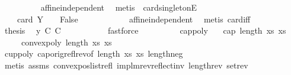 \begin{isabellebody}
\ \ \ \ \ \ \ \ \isamarkupfalse%
\ affine{\isacharunderscore}{\kern0pt}independent{\isacharunderscore}{\kern0pt}{}\ \isamarkupfalse%
\ {\isacharparenleft}{\kern0pt}metis\ {\isachardoublequoteopen}{}{\isachardoublequoteclose}\ card{\isacharunderscore}{\kern0pt}{}{\isacharunderscore}{\kern0pt}singletonE{\isacharparenright}{\kern0pt}\isanewline
\ \ \ \ \ \ \isamarkupfalse%
\ \ \ \ {\isachardoublequoteopen}card\ Y\ {\isacharequal}{\kern0pt}\ {}\ {\isasymLongrightarrow}\ False{\isachardoublequoteclose}\ \isanewline
\ \ \ \ \ \ \ \ \isamarkupfalse%
\ {\isachardoublequoteopen}{}{\isachardoublequoteclose}\ affine{\isacharunderscore}{\kern0pt}independent{\isacharunderscore}{\kern0pt}{}\ \isamarkupfalse%
\ {\isacharparenleft}{\kern0pt}metis\ card{\isacharunderscore}{\kern0pt}{}{\isacharunderscore}{\kern0pt}iff{\isacharparenright}{\kern0pt}\isanewline
\ \ \ \ \ \ \isamarkupfalse%
\ {\isacharquery}{\kern0pt}thesis\ \isamarkupfalse%
\ y{\isacharunderscore}{\kern0pt}{}\ C{}\ C{}\ \isanewline
\ \ \ \ \ \ \ \ \isamarkupfalse%
\ fastforce\ \isanewline
\ \ \ \ \isamarkupfalse%
\isanewline
\ \ \isamarkupfalse%
\isanewline
{}\isamarkupfalse%
%
\endisatagproof
{\isafoldproof}%
%
\isadelimproof
\isanewline
%
\endisadelimproof
\isanewline
{}\isamarkupfalse%
\ cap{\isacharunderscore}{\kern0pt}poly{\isacharcolon}{\kern0pt}\isanewline
\ \ \ {\isachardoublequoteopen}cap\ {\isacharparenleft}{\kern0pt}length\ xs{\isacharparenright}{\kern0pt}\ xs{\isachardoublequoteclose}\isanewline
\ \ \ \ \ {\isachardoublequoteopen}convex{\isacharunderscore}{\kern0pt}poly\ {\isacharparenleft}{\kern0pt}length\ xs{\isacharparenright}{\kern0pt}\ xs{\isachardoublequoteclose}\isanewline
%
\isadelimproof
\ \ %
\endisadelimproof
%
\isatagproof
{}\isamarkupfalse%
\ cup{\isacharunderscore}{\kern0pt}poly\ cap{\isacharunderscore}{\kern0pt}orig{\isacharunderscore}{\kern0pt}refl{\isacharunderscore}{\kern0pt}rev{\isacharbrackleft}{\kern0pt}of\ {\isachardoublequoteopen}length\ xs{\isachardoublequoteclose}\ {\isachardoublequoteopen}xs{\isachardoublequoteclose}{\isacharbrackright}{\kern0pt}\ length{\isacharunderscore}{\kern0pt}neg\isanewline
\ \ \isamarkupfalse%
\ {\isacharparenleft}{\kern0pt}metis\ assms\ convex{\isacharunderscore}{\kern0pt}pos{\isacharunderscore}{\kern0pt}list{\isacharunderscore}{\kern0pt}refl\ implm{\isacharunderscore}{\kern0pt}rev{\isacharunderscore}{\kern0pt}reflect{\isacharunderscore}{\kern0pt}inv\ length{\isacharunderscore}{\kern0pt}rev\ set{\isacharunderscore}{\kern0pt}rev{\isacharparenright}{\kern0pt}%

\end{isabellebody}
